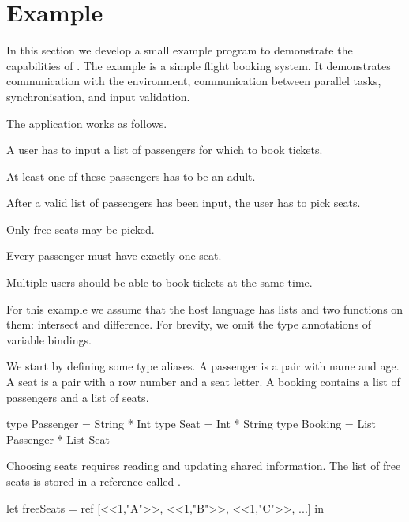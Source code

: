 
\section{Example}


In this section we develop a small example program to demonstrate the capabilities of \TOPHAT.
The example is a simple flight booking system.
It demonstrates communication with the environment, communication between parallel tasks, synchronisation, and input validation.

The application works as follows.
\begin{enumerate*}
  \item A user has to input a list of passengers for which to book tickets.
  \item At least one of these passengers has to be an adult.
  \item After a valid list of passengers has been input, the user has to pick seats.
  \item Only free seats may be picked.
  \item Every passenger must have exactly one seat.
  \item Multiple users should be able to book tickets at the same time.
\end{enumerate*}
For this example we assume that the host language has lists and two functions on them: intersect and difference.
For brevity, we omit the type annotations of variable bindings.

We start by defining some type aliases.
A passenger is a pair with name and age.
A seat is a pair with a row number and a seat letter.
A booking contains a list of passengers and a list of seats.
\begin{TASK}
  type Passenger = String * Int
  type Seat = Int * String
  type Booking = List Passenger * List Seat
\end{TASK}

Choosing seats requires reading and updating shared information.
The list of free seats is stored in a reference called .
\begin{TASK}
  let freeSeats = ref [<<1,"A">>, <<1,"B">>, <<1,"C">>, ...] in
\end{TASK}

